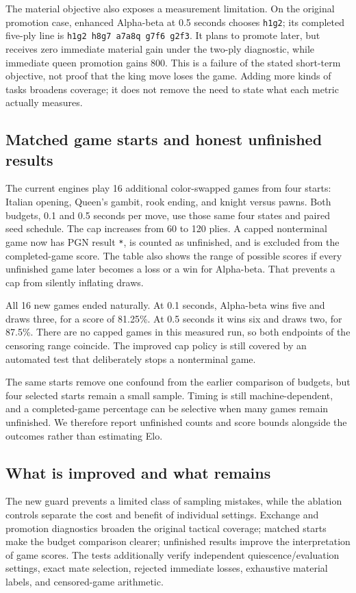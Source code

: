 \documentclass[oneside,final]{hcmut-report}
\begin{document}
The material objective also exposes a measurement limitation. On the
original promotion case, enhanced Alpha-beta at 0.5 seconds chooses
\texttt{h1g2}; its completed five-ply line is
\texttt{h1g2 h8g7 a7a8q g7f6 g2f3}. It plans to promote later, but receives
zero immediate material gain under the two-ply diagnostic, while immediate
queen promotion gains 800. This is a failure of the stated short-term
objective, not proof that the king move loses the game. Adding more kinds
of tasks broadens coverage; it does not remove the need to state what each
metric actually measures.

\subsection{Matched game starts and honest unfinished results}
The current engines play 16 additional color-swapped games from four starts:
Italian opening, Queen's gambit, rook ending, and knight versus pawns.
Both budgets, 0.1 and 0.5 seconds per move, use those same four states and
paired seed schedule. The cap increases from 60 to 120 plies. A capped
nonterminal game now has PGN result \texttt{*}, is counted as unfinished,
and is excluded from the completed-game score. The table also shows the
range of possible scores if every unfinished game later becomes a loss
or a win for Alpha-beta. That prevents a cap from silently inflating draws.



All 16 new games ended naturally. At 0.1 seconds, Alpha-beta wins five
and draws three, for a score of 81.25\%. At 0.5 seconds it wins six and
draws two, for 87.5\%. There are no capped games in this measured run,
so both endpoints of the censoring range coincide. The improved cap policy
is still covered by an automated test that deliberately stops a nonterminal game.

The same starts remove one confound from the earlier comparison of
budgets, but four selected starts remain a small sample. Timing is still
machine-dependent, and a completed-game percentage can be selective when
many games remain unfinished. We therefore report unfinished counts and
score bounds alongside the outcomes rather than estimating Elo.

\subsection{What is improved and what remains}
The new guard prevents a limited class of sampling mistakes, while the
ablation controls separate the cost and benefit of individual settings.
Exchange and promotion diagnostics broaden the original tactical coverage;
matched starts make the budget comparison clearer; unfinished results
improve the interpretation of game scores. The tests additionally verify
independent quiescence/evaluation settings, exact mate selection, rejected
immediate losses, exhaustive material labels, and censored-game arithmetic.
\end{document}
